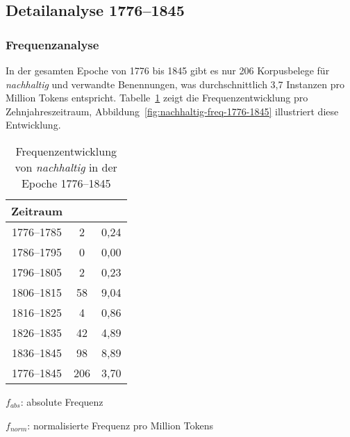 \documentclass[
    german,
    a4paper,%
    12pt,%
    oneside,%
    toc=bibliography,
    final,
]{scrartcl}
\begin{document}
\subsection{Detailanalyse 1776–1845}
\label{subsec:detail-1776–1845}


\subsubsection{Frequenzanalyse}

In der gesamten Epoche von 1776 bis 1845 gibt es nur 206 Korpusbelege für \textit{nachhaltig} und verwandte Benennungen, was durchschnittlich 3,7 Instanzen pro Million Tokens entspricht. Tabelle~\ref{tab:freq-epoche1} zeigt die Frequenzentwicklung pro Zehnjahreszeitraum, Abbildung~\ref{fig:nachhaltig-freq-1776-1845} illustriert diese Entwicklung.

\begin{table}[h!]
	\centering
	\renewcommand{\arraystretch}{1.5}
	
	\caption{Frequenzentwicklung von \textit{nachhaltig} in der Epoche 1776–1845}
	\label{tab:freq-epoche1}
	
	\begin{threeparttable}
	
	\begin{tabular}{ccc}
	\textbf{Zeitraum} & \boldmath{$f_{abs}$} & \boldmath{$f_{norm}$} \\ \hline
	1776–1785 & 2 & 0,24 \\ \hline
	1786–1795 & 0 & 0,00 \\ \hline
	1796–1805 & 2 & 0,23 \\ \hline
	1806–1815 & 58 & 9,04 \\ \hline
	1816–1825 & 4 & 0,86 \\ \hline
	1826–1835 & 42 & 4,89 \\ \hline
	1836–1845 & 98 & 8,89 \\ \hline\hline
	1776–1845 & 206 & 3,70 \\ \hline
	\end{tabular} 
	
	\begin{tablenotes}
	\footnotesize
	\setlength{\itemindent}{-1.2em}
	\item $f_{abs}$: absolute Frequenz
	\item $f_{norm}$: normalisierte Frequenz pro Million Tokens
	\end{tablenotes}
	
	\end{threeparttable}
\end{table}
\end{document}
